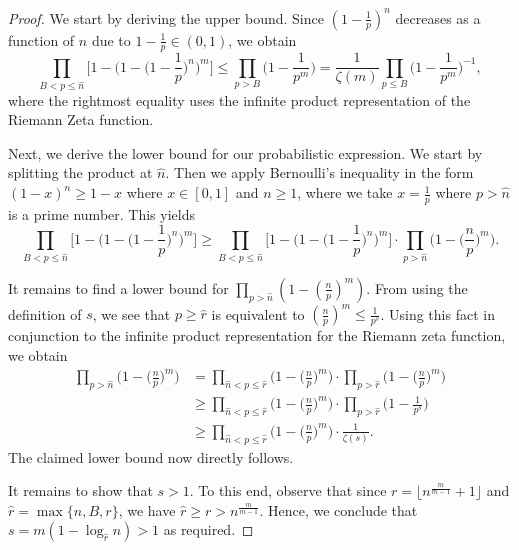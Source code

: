 \documentclass[10pt,a4paper]{article}
\theoremstyle{definition}
\theoremstyle{remark}
\begin{document}
\begin{proof}
We start by deriving the upper bound. Since $(1 - \frac{1}{p})^n$ decreases as a function of $n$ due to $1 - \frac{1}{p} \in (0, 1)$, we obtain
$$\prod_{B<p\leq\hat{n}} \Big[1 - \Big(1 - \Big(1 - \frac{1}{p}\Big)^n \Big)^m \Big] \leq \prod_{p>B} \Big(1 - \frac{1}{p^m}\Big) = \frac{1}{\zeta(m)} \prod_{p\leq B} \Big(1 - \frac{1}{p^m}\Big)^{-1},$$
where the rightmost equality uses the infinite product representation of the Riemann Zeta function.

\vspace{.1 in}

Next, we derive the lower bound for our probabilistic expression. We start by splitting the product at $\hat{n}$. Then we apply Bernoulli's inequality in the form $(1 - x)^n \geq 1 - x$ where $x \in [0, 1]$ and $n \geq 1$, where we take $x = \frac{1}{p}$ where $p > \hat{n}$ is a prime number. This yields 
$$\prod_{B<p\leq\hat{n}} \Big[1 - \Big(1 - \Big(1 - \frac{1}{p}\Big)^n \Big)^m \Big] \geq \prod_{B<p\leq \hat{n}}\Big[1 - \Big(1 - \Big(1 - \frac{1}{p}\Big)^n \Big)^m \Big] \cdot \prod_{p>\hat{n}}\Big(1 - \Big(\frac{n}{p}\Big)^m\Big).$$

\vspace{.1 in}

It remains to find a lower bound for $\prod_{p>\hat{n}} (1 - (\frac{n}{p})^m)$. From using the definition of $s$, we see that $p \geq \hat{r}$ is equivalent to $(\frac{n}{p})^m \leq \frac{1}{p^s}$. Using this fact in conjunction to the infinite product representation for the Riemann zeta function, we obtain 
\begin{align*} \prod_{p>\hat{n}}\Big(1 - \Big(\frac{n}{p}\Big)^m\Big) &= \prod_{\hat{n}< p \leq \hat{r}}\Big(1 - \Big(\frac{n}{p}\Big)^m\Big) \cdot \prod_{p>\hat{r}}\Big(1 - \Big(\frac{n}{p}\Big)^m\Big)\\ &\geq  \prod_{\hat{n}< p \leq \hat{r}}\Big(1 - \Big(\frac{n}{p}\Big)^m\Big) \cdot \prod_{p>\hat{r}}\Big(1 - \frac{1}{p^s}\Big)\\ &\geq  \prod_{\hat{n}< p \leq \hat{r}}\Big(1 - \Big(\frac{n}{p}\Big)^m\Big) \cdot \frac{1}{\zeta(s)}. \end{align*}
The claimed lower bound now directly follows. 

\vspace{.1 in}

It remains to show that $s > 1$. To this end, observe that since $r=\lfloor n^{\frac{m}{m-1}}+1\rfloor$ and $\hat{r} = \max\{n, B, r\}$, we have $\hat{r} \geq r > n^{\frac{m}{m-1}}$. Hence, we conclude that $s = m(1 - \log_{\hat{r}}{n}) > 1$ as required.
\end{proof}
	 
\end{document}
